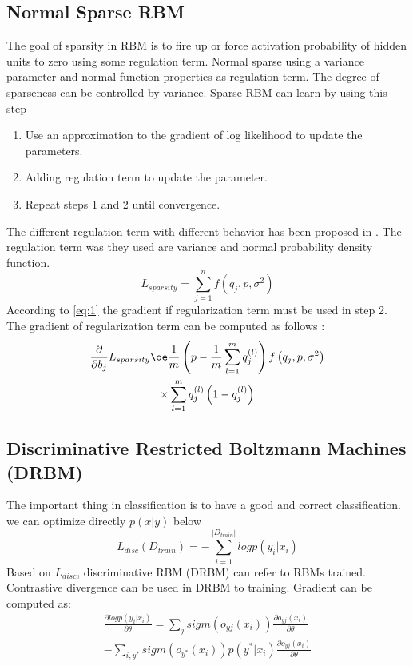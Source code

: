 \documentclass[conference]{IEEEtran}
\begin{document}
\subsection{Normal Sparse RBM}
The goal of sparsity in RBM is to fire up or force activation probability of hidden units to zero using some regulation term.  Normal sparse using a variance parameter and normal
function properties as regulation term\cite{keyvanrad1}. The degree of sparseness can be controlled by variance. 
Sparse RBM can learn by using this step\cite{lee1}
\begin{enumerate}
	\item Use an approximation to the
	gradient of log likelihood to update the parameters.
	\item Adding regulation term to update the parameter.
	\item Repeat steps 1 and 2 until convergence.
\end{enumerate}

The different regulation term with different behavior has been proposed 
in \cite{keyvanrad1}. The regulation term  was they used are variance and normal probability
density function.
\begin{equation}\label{eq:1}
L_{sparsity}=\sum_{j=1}^{n}f(q_{j},p,\sigma^{2})
\end{equation}
According to \ref{eq:1} the gradient if regularization
term must be used in step 2. The gradient of regularization
term can be computed as follows :
\begin{multline}
\frac{\partial}{\partial b_{j}}L_{sparsity }\oe  \frac{1}{m}\left ( p-\frac{1}{m}\sum_{l=1}^{m}q_{j}^{(l)} \right )f\left ( q_{j},p,\sigma^{2}   \right )\\ \times\sum_{l=1}^{m}q_{j}^{(l)}\left ( 1-q_{j}^{(l)} \right )
\end{multline}

\subsection{Discriminative Restricted Boltzmann Machines (DRBM)}
The important thing in classification is to have a good and
correct classification. we can optimize directly 
$ p\left ( x|y \right )$  below\cite{larochelle1}
\begin{equation}
L_{disc}\left ( D_{train} \right )= -\sum_{i=1}^{\left | D_{train} \right |}log    p\left ( y_{i}|x_{i} \right )
\end{equation}
Based on $L_{disc}$, discriminative RBM (DRBM) can refer to
RBMs trained. Contrastive divergence can be used in DRBM
to training\cite{taylor1}. Gradient can be computed as:
\begin{multline}
\frac{\partial log p\left ( y_{i}|x_{i} \right )}{\partial\theta } =\sum_{j}sigm\left ( o_{yj}\left ( x_{i} \right ) \right )\frac{\partial o_{yj}\left ( x_{i} \right )}{\partial\theta}
\\ -\sum_{i,y^{*}}sigm\left ( o_{y^{*}}\left ( x_{i} \right ) \right )p\left ( y^{*}|x_{i} \right )\frac{\partial o_{yj}\left ( x_{i} \right )}{\partial\theta}
\end{multline}
\end{document}
